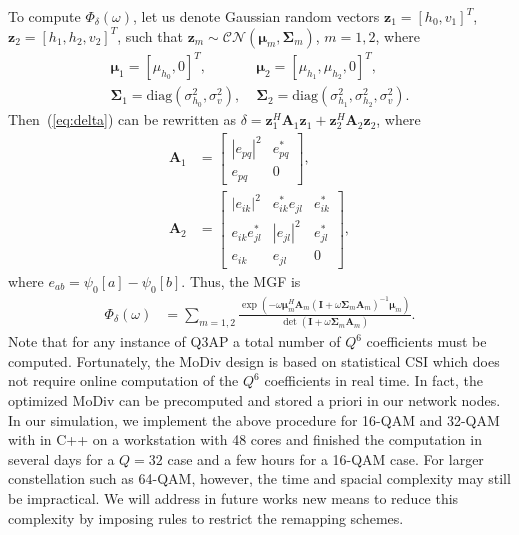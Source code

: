 \documentclass[journal]{IEEEtran}
\begin{document}
To compute $\Phi_{\delta}(\omega)$, let us denote Gaussian random vectors
$\mathbf{z}_1 = [h_0, v_1]^T$, $\mathbf{z}_{2} = [h_1, h_2, v_2]^T$, such
that $\mathbf{z}_m\sim\mathcal{CN}(\bm{\mu}_m, \mathbf{\Sigma}_m)$, $m=1,2$,
where
\begin{align}
    \bm{\mu}_1 = [\mu_{h_0}, 0]^T,& \; \bm{\mu}_{2} = [\mu_{h_1}, \mu_{h_2},
    0]^T,
    \\
    \mathbf{\Sigma}_1 = \mbox{diag}\left(\sigma_{h_0}^2, \sigma_v^2\right), & \;
    \mathbf{\Sigma}_2 = \mbox{diag}\left(\sigma_{h_1}^2, \sigma_{h_2}^2,
    \sigma_v^2\right).
\end{align}
Then~(\ref{eq:delta}) can be rewritten as $\delta =
\mathbf{z}_1^H\mathbf{A}_1\mathbf{z}_1 +
\mathbf{z}_{2}^H\mathbf{A}_{2}\mathbf{z}_{2}$, where
\begin{subequations}
    \begin{align}
        \mathbf{A}_1 & = \left[
            \begin{array}{cc}
                |e_{pq}|^2  & e_{pq}^* \\
                e_{pq} & 0
            \end{array}
        \right], \\
        \mathbf{A}_2 & = \left[
            \begin{array}{ccc}
            |e_{ik}|^2 & e_{ik}^*e_{jl} & e_{ik}^*
            \\
            e_{ik}e_{jl}^* & |e_{jl}|^2 & e_{jl}^*
            \\
            e_{ik} & e_{jl} & 0
        \end{array}
        \right],
    \end{align}
\end{subequations}
where $e_{ab} = \psi_0[a] - \psi_0[b]$. Thus, the MGF is
\begin{align}
    \Phi_{\delta}(\omega) & = \sum_{m=1,2}
    \frac{\exp(-\omega\bm{\mu}_m^H\mathbf{A}_m(\mathbf{I} +
    \omega\mathbf{\Sigma}_m\mathbf{A}_m)^{-1}\bm{\mu}_m)}{\det(\mathbf{I} +
    \omega\mathbf{\Sigma}_m\mathbf{A}_m)}.
\end{align}
Note that for any instance of Q3AP a total number of $Q^6$ coefficients must be
computed. Fortunately, the MoDiv design is based on statistical CSI which does
not require online computation of the $Q^6$ coefficients in real time. In fact,
the optimized MoDiv can be precomputed and stored a priori in our network nodes.
In our simulation, we implement the above procedure for 16-QAM and 32-QAM with
in C++ on a workstation with 48 cores and finished the computation in several
days for a $Q=32$ case and a few hours for a 16-QAM case. For larger
constellation such as 64-QAM, however, the time and spacial complexity may still
be impractical. We will address in future works new means to reduce this complexity by 
imposing rules to restrict the remapping schemes.
\end{document}
